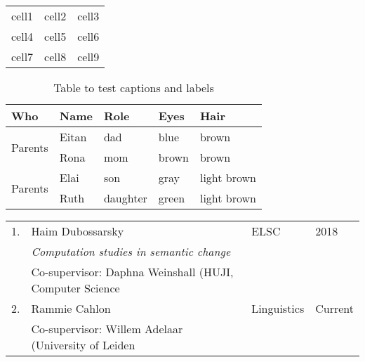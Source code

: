 \documentclass{article}
\begin{document}
\begin{tabular}{ c c c }
 cell1 & cell2 & cell3 \\ 
 cell4 & cell5 & cell6 \\  
 cell7 & cell8 & cell9    
\end{tabular}
\vspace{10pt}

\begin{table}[h!]
\centering
\begin{tabular}{|l|l| l| l| l|}
\hline \hline
Who & Name & Role & Eyes & Hair\\
\hline \hline
\multirow{2}{5em}{Parents} & Eitan & dad & blue & brown\\
& Rona & mom & brown & brown\\
\hline
\multirow{2}{5em}{Parents} & Elai & son & gray & light brown\\
& Ruth & daughter & green & light brown\\
\hline 
\end{tabular}
\caption{Table to test captions and labels}
\label{table:1}
\end{table}
\vspace{20}

\begin{tabular}{l l l l }
1. & Haim Dubossarsky & ELSC & 2018\\
& \textit{Computation studies in semantic change}&&\\
& Co-supervisor: Daphna Weinshall (HUJI, Computer Science}&&\\
2. & Rammie Cahlon & Linguistics & Current\\
& {Co-supervisor: Willem Adelaar (University of Leiden}&&&\\
\hline 
\end{tabular}
\end{document}
